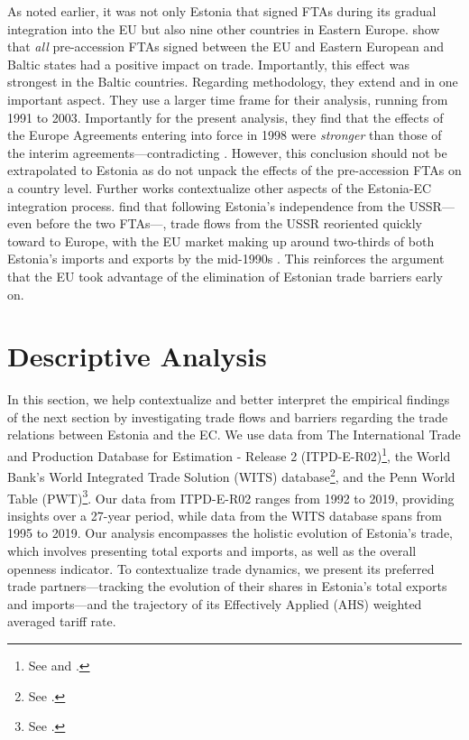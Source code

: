 \documentclass[a4paper,10pt]{article}
\begin{document}
As noted earlier, it was not only Estonia that signed FTAs during its gradual integration into the EU but also nine other countries in Eastern Europe. \cite{spies_trade_2009} show that \textit{all} pre-accession FTAs signed between the EU and Eastern European and Baltic states had a positive impact on trade. Importantly, this effect was strongest in the Baltic countries. Regarding methodology, they extend \cite{adam_trade_2003} and \cite{benedictis_hub-and-spoke_2005} in one important aspect. They use a larger time frame for their analysis, running from 1991 to 2003. Importantly for the present analysis, they find that the effects of the Europe Agreements entering into force in 1998 were \textit{stronger} than those of the interim agreements---contradicting \cite{adam_trade_2003}. However, this conclusion should not be extrapolated to Estonia as \cite{spies_trade_2009} do not unpack the effects of the pre-accession FTAs on a country level. Further works contextualize other aspects of the Estonia-EC integration process. \cite{fainstein_foreign_2010} find that following Estonia's independence from the USSR---even before the two FTAs---, trade flows from the USSR reoriented quickly toward to Europe, with the EU market making up around two-thirds of both Estonia's imports and exports by the mid-1990s \citep{fainstein_foreign_2010}. This reinforces the argument that the EU took advantage of the elimination of Estonian trade barriers early on.

\section{Descriptive Analysis} \label{descriptive}

In this section, we help contextualize and better interpret the empirical findings of the next section by investigating trade flows and barriers regarding the trade relations between Estonia and the EC. We use data from The International Trade and Production Database for Estimation - Release 2 (ITPD-E-R02)\footnote{See \cite{borchert_international_2022} and \cite{borchert_international_2021}.}, the World Bank's World Integrated Trade Solution (WITS) database\footnote{See \cite{world_integrated_trade_solution_estonia_2024}.}, and the Penn World Table (PWT)\footnote{See \cite{feenstra_next_2015}.}. Our data from ITPD-E-R02 ranges from 1992 to 2019, providing insights over a 27-year period, while data from the WITS database spans from 1995 to 2019. Our analysis encompasses the holistic evolution of Estonia's trade, which involves presenting total exports and imports, as well as the overall openness indicator. To contextualize trade dynamics, we present its preferred trade partners---tracking the evolution of their shares in Estonia's total exports and imports---and the trajectory of its Effectively Applied (AHS) weighted averaged tariff rate.
\end{document}
